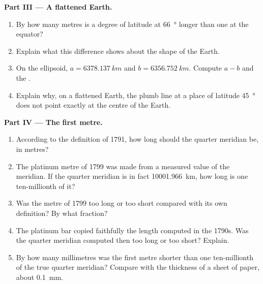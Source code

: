 \begin{problem}
\medskip
\noindent\textbf{Part III --- A flattened Earth.}
\begin{enumerate}[resume]
  \item By how many metres is a degree of latitude at \qty{66}{\degree}
        longer than one at the equator?
  \item Explain what this difference shows about the shape of the Earth.
  \item On the ellipsoid, $a = \qty{6378.137}{km}$ and
        $b = \qty{6356.752}{km}$. Compute $a - b$ and the .
  \item Explain why, on a flattened Earth, the plumb line at a place of
        latitude \qty{45}{\degree} does not point exactly at the centre of
        the Earth.
\end{enumerate}

\medskip
\noindent\textbf{Part IV --- The first metre.}
\begin{enumerate}[resume]
  \item According to the definition of 1791, how long should the quarter
        meridian be, in metres?
  \item The platinum metre of 1799 was made from a measured value of the
        meridian. If the quarter meridian is in fact \qty{10001.966}{km},
        how long is one ten-millionth of it?
  \item Was the metre of 1799 too long or too short compared with its own
        definition? By what fraction?
  \item The platinum bar copied faithfully the length computed in the 1790s.
        Was the quarter meridian computed then too long or too short?
        Explain.
  \item By how many millimetres was the first metre shorter than one
        ten-millionth of the true quarter meridian? Compare with the
        thickness of a sheet of paper, about \qty{0.1}{mm}.
\end{enumerate}
\end{problem}
